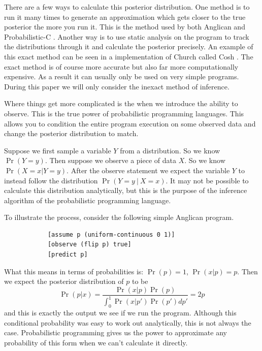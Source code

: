 \documentclass[a4paper]{article}
\begin{document}
There are a few ways to calculate this posterior distribution. One method is to run it many times to generate an approximation which gets closer to the true posterior the more you run it. This is the method used by both Anglican and Probabilistic-C \cite{Anglican, ProbabilisticC}. Another way is to use static analysis on the program to track the distributions through it and calculate the posterior precisely. An example of this exact method can be seen in a implementation of Church called Cosh \cite{Cosh}. The exact method is of course more accurate but also far more computationally expensive. As a result it can usually only be used on very simple programs. During this paper we will only consider the inexact method of inference.

Where things get more complicated is the when we introduce the ability to observe. This is the true power of probabilistic programming languages. This allows you to condition the entire program execution on some observed data and change the posterior distribution to match.

Suppose we first sample a variable \(Y\) from a distribution. So we know \(\Pr(Y = y)\). Then suppose we observe a piece of data \(X\). So we know \(\Pr(X = x | Y = y)\). After the observe statement we expect the variable \(Y\) to instead follow the distribution \(\Pr(Y = y\ |\ X = x)\). It may not be possible to calculate this distribution analytically, but this is the purpose of the inference algorithm of the probabilistic programming language.

To illustrate the process, consider the following simple Anglican program.

\begin{center}
	\begin{varwidth}{\linewidth}
		\small
		\begin{verbatim}
			[assume p (uniform-continuous 0 1)]
			[observe (flip p) true]
			[predict p]
		\end{verbatim}
	\end{varwidth}
\end{center}
What this means in terms of probabilities is: \(\Pr(p) = 1\), \(\Pr(x | p) = p\). Then we expect the posterior distribution of \(p\) to be
\[\Pr(p | x) = \frac{\Pr(x | p) \Pr(p)}{\int_0^1 \Pr(x | p') \Pr(p') dp'} = 2p\]
and this is exactly the output we see if we run the program. Although this conditional probability was easy to work out analytically, this is not always the case. Probabilistic programming gives us the power to approximate any probability of this form when we can't calculate it directly.
\end{document}
